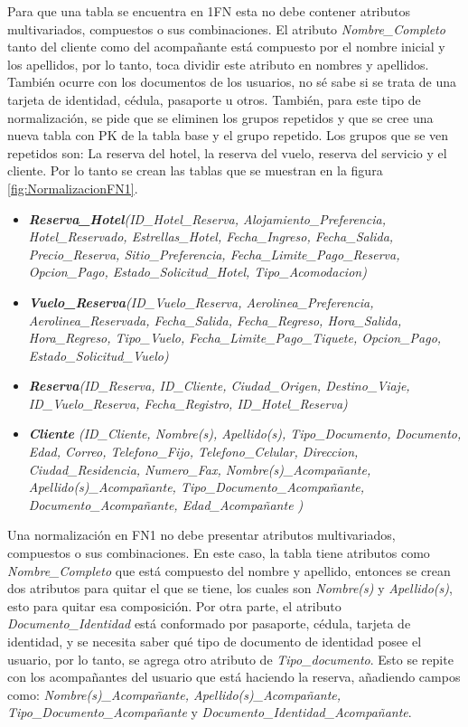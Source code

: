 \documentclass{article}
\begin{document}
Para que una tabla se encuentra en 1FN esta no debe contener atributos multivariados, compuestos o sus combinaciones. El atributo \textit{Nombre\_Completo} tanto del cliente como del acompañante está compuesto por el nombre inicial y los apellidos, por lo tanto, toca dividir este atributo en nombres y apellidos. También ocurre con los documentos de los usuarios, no sé sabe si se trata de una tarjeta de identidad, cédula, pasaporte u otros. También, para este tipo de normalización, se pide que se eliminen los grupos repetidos y que se cree una nueva tabla con PK de la tabla base y el grupo repetido. Los grupos que se ven repetidos son: La reserva del hotel, la reserva del vuelo, reserva del servicio y el cliente. Por lo tanto se crean las tablas que se muestran en la figura \ref{fig:NormalizacionFN1}.
\begin{itemize}
    \item \textit{\textbf{Reserva\_Hotel}(ID\_Hotel\_Reserva, Alojamiento\_Preferencia, Hotel\_Reservado, Estrellas\_Hotel, Fecha\_Ingreso, Fecha\_Salida, Precio\_Reserva, Sitio\_Preferencia, Fecha\_Limite\_Pago\_Reserva, Opcion\_Pago, Estado\_Solicitud\_Hotel, Tipo\_Acomodacion)}
    \item \textit{\textbf{Vuelo\_Reserva}(ID\_Vuelo\_Reserva, Aerolinea\_Preferencia, Aerolinea\_Reservada, Fecha\_Salida, Fecha\_Regreso, Hora\_Salida, Hora\_Regreso, Tipo\_Vuelo, Fecha\_Limite\_Pago\_Tiquete, Opcion\_Pago, Estado\_Solicitud\_Vuelo)}
    \item \textit{\textbf{Reserva}(ID\_Reserva, ID\_Cliente, Ciudad\_Origen, Destino\_Viaje, ID\_Vuelo\_Reserva, Fecha\_Registro, ID\_Hotel\_Reserva)}
    \item \textit{\textbf{Cliente} (ID\_Cliente, Nombre(s), Apellido(s), Tipo\_Documento, Documento, Edad, Correo, Telefono\_Fijo, Telefono\_Celular, Direccion, Ciudad\_Residencia, Numero\_Fax, Nombre(s)\_Acompañante, Apellido(s)\_Acompañante, Tipo\_Documento\_Acompañante, Documento\_Acompañante, Edad\_Acompañante )}
\end{itemize}



Una normalización en FN1 no debe presentar atributos multivariados, compuestos o sus combinaciones. En este caso, la tabla tiene atributos como \textit{Nombre\_Completo} que está compuesto del nombre y apellido, entonces se crean dos atributos para quitar el que se tiene, los cuales son \textit{Nombre(s)} y \textit{Apellido(s)}, esto para quitar esa composición. Por otra parte, el atributo \textit{Documento\_Identidad} está conformado por pasaporte, cédula, tarjeta de identidad, y se necesita saber qué tipo de documento de identidad posee el usuario, por lo tanto, se agrega otro atributo de \textit{Tipo\_documento}. Esto se repite con los acompañantes del usuario que está haciendo la reserva, añadiendo campos como: \textit{Nombre(s)\_Acompañante, Apellido(s)\_Acompañante, Tipo\_Documento\_Acompañante} y \textit{Documento\_Identidad\_Acompañante}. 
\end{document}
